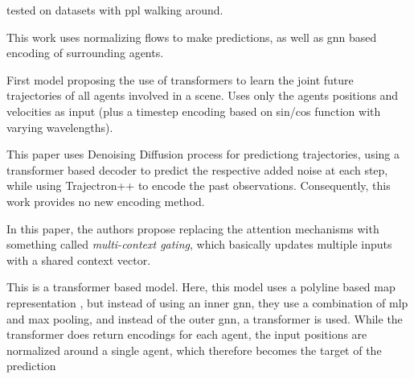 tested on datasets with ppl walking around.

\cite{scholler2021flomo} This work uses normalizing flows to make predictions, as well as gnn based encoding of surrounding agents.


\cite{yuan2021agentformer} First model proposing the use of transformers to learn the joint future trajectories of all agents involved in a scene. Uses only the agents positions and velocities as input (plus a timestep encoding based on sin/cos function with varying wavelengths). 



\cite{navarro2022social}


\cite{gu2022stochastic} This paper uses Denoising Diffusion process for predictiong trajectories, using a transformer based decoder to predict the respective added noise at each step, while using Trajectron++ to encode the past observations. Consequently, this work provides no new encoding method.


\cite{varadarajan2022multipath} In this paper, the authors propose replacing the attention mechanisms with something called \textit{multi-context gating}, which basically updates multiple inputs with a shared context vector.


\cite{shi2022motion} This is a transformer based model. Here, this model uses a polyline based map representation \cite{gao2020vectornet}, but instead of using an inner gnn, they use a combination of mlp and max pooling, and instead of the outer gnn, a transformer is used. While the transformer does return encodings for each agent, the input positions are normalized around a single agent, which therefore becomes the target of the prediction



